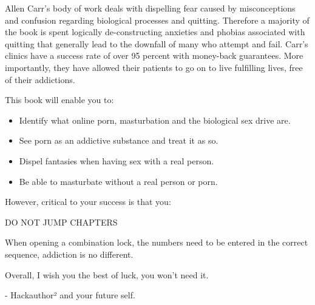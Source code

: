 \documentclass[easypeasy.tex]{subfiles}
\begin{document}
Allen Carr's body of work deals with dispelling fear caused by misconceptions and confusion regarding biological processes and quitting. Therefore a majority of the book is spent logically de-constructing anxieties and phobias associated with quitting that generally lead to the downfall of many who attempt and fail. Carr's clinics have a success rate of over 95 percent with money-back guarantees. More importantly, they have allowed their patients to go on to live fulfilling lives, free of their addictions.

This book will enable you to:
\begin{itemize}
  \item Identify what online porn, masturbation and the biological sex drive are.
  \item See porn as an addictive substance and treat it as so.
  \item Dispel fantasies when having sex with a real person.
  \item Be able to masturbate without a real person or porn.
\end{itemize}

However, critical to your success is that you:

{\huge DO NOT JUMP CHAPTERS}

When opening a combination lock, the numbers need to be entered in the correct sequence, addiction is no different.

Overall, I wish you the best of luck, you won't need it.

- Hackauthor² and your future self.
\end{document}
